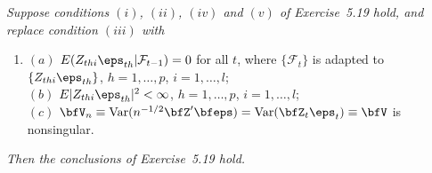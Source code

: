 \begin{theorem}\label{thm:iv-mds-clt}
\textit{Suppose conditions $(i)$, $(ii)$, $(iv)$ and $(v)$ of Exercise~5.19 hold, and replace condition $(iii)$ with}
\begin{enumerate}
\item[$(iii')$] $(a)$ $E(Z_{thi}\eps_{th}|\mathcal{F}_{t-1}) = 0$ for all $t$, where $\{\mathcal{F}_t\}$ is adapted to $\{Z_{thi}\eps_{th}\}$, $h = 1, \ldots, p$, $i = 1, \ldots, l$;\\
$(b)$ $E|Z_{thi}\eps_{th}|^2 < \infty$, $h = 1, \ldots, p$, $i = 1, \ldots, l$;\\
$(c)$ $\bfV_n \equiv \Var(n^{-1/2}\bfZ'\bfeps) = \Var(\bfZ_t\eps_t) \equiv \bfV$ is nonsingular.
\end{enumerate}

\textit{Then the conclusions of Exercise~5.19 hold.}
\end{theorem}

